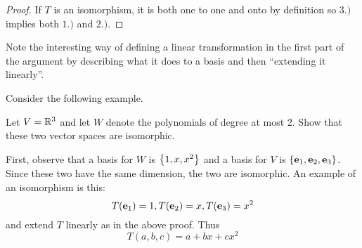 \begin{proof}
If $T$ is an isomorphism, it is both one to one and onto by definition so $
3.)$ implies both $1.)$ and $2.)$.
\end{proof}

Note the interesting way of defining a linear transformation in the first
part of the argument by describing what it does to a basis and then
``extending it linearly''.

Consider the following example.

\begin{example}{}{}
Let $V=\mathbb{R}^{3}$ and let $W$ denote the polynomials of degree at most
2. Show that these two vector spaces are isomorphic.
\end{example}

\begin{solution}
First, observe that a basis for $W$ is $\left\{1,x,x^{2}\right\} $ and a basis for $V$
is $\left\{\mbox{\bf e}_{1},\mbox{\bf e}_{2},\mbox{\bf e}_{3}\right\}$. Since these two
have the same dimension, the two are
isomorphic. An example of an isomorphism is this:\
\begin{equation*}
T(\mbox{\bf e}_{1})=1,T(\mbox{\bf e}_{2})=x,T(\mbox{\bf e}_{3})=x^{2}
\end{equation*}
and extend $T$ linearly as in the above proof. Thus
\begin{equation*}
T(a,b,c) =a+bx+cx^{2}
\end{equation*}
\end{solution}
